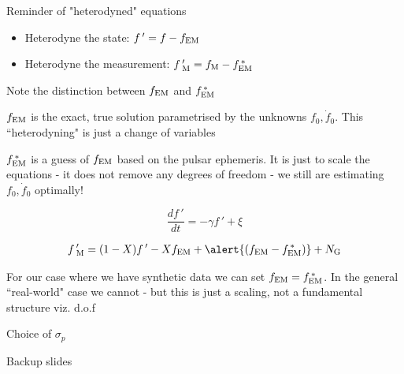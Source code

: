 \documentclass[10pt]{beamer}
\begin{document}
	\begin{frame}{}
	
	Reminder of "heterodyned" equations
	
	\begin{itemize}
		\item Heterodyne the state: $f \, ' = f - f_{\rm EM}$ 
		\item Heterodyne the measurement: $f \, '_{\rm M}  = f_{\rm M} - f^{\, *}_{\rm EM}$ 
	\end{itemize}
	
	Note the distinction between $ f_{\rm EM}$ and $f^{\, *}_{\rm EM}$
	
	$f_{\rm EM}$ is the exact, true solution parametrised by the unknowns $f_0, \dot{f}_0$. This ``heterodyning" is just a change of variables
	
	$f^{\, *}_{\rm EM}$ is a guess of $f_{\rm EM}$ based on the pulsar ephemeris. It is just to scale the equations - it does not remove any degrees of freedom - we still are estimating $f_0, \dot{f}_0$ optimally!
		
	\begin{equation}
		\frac{df \, '}{dt} = - \gamma f \, '  + \xi 
	\end{equation}

	\begin{eqnarray}
		f \, '_{\rm M} = (1 - X)f \, ' - X f_{\rm EM} + \alert{(f_{\rm EM} - f^{\, *}_{\rm EM})} +  N_{\rm G}
	\end{eqnarray}

	For our case where we have synthetic data we can set $f_{\rm EM} = f^{\, *}_{\rm EM}$. In the general ``real-world" case we cannot - but this is just a scaling, not a  fundamental structure viz. d.o.f
	
	
\end{frame}


	\begin{frame}{}
	
Choice of $\sigma_p$
	
\end{frame}



\begin{frame}[standout]
	Backup slides
\end{frame}

\appendix
\end{document}
